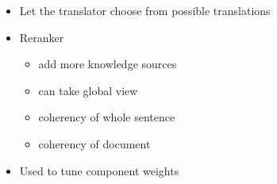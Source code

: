 \documentclass[landscape]{uedslides2C}
\begin{document}
\vspace{20mm}
\begin{itemize}
\item  Let the translator choose from possible translations
\item  Reranker
	\begin{itemize}
	\item add more knowledge sources
	\item can take global view
	\item coherency of whole sentence
	\item coherency of document
	\end{itemize}
\item  Used to tune component weights
\end{itemize}

%
%      
%      
%          
% 
\end{document}
